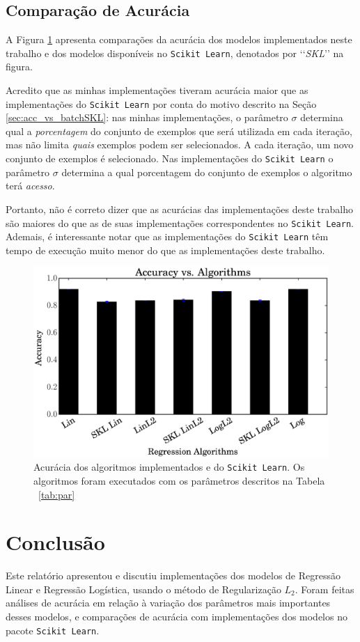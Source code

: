 \documentclass[a4paper, 12pt]{article}
\begin{document}
\newpage
\subsection{Comparação de Acurácia}

A Figura \ref{fig:algorithm} apresenta comparações da acurácia dos modelos
implementados neste trabalho e dos modelos disponíveis no \texttt{Scikit
Learn}, denotados por \lq\lq{}\textit{SKL}\rq\rq{} na figura.

Acredito que as minhas implementações tiveram acurácia maior que as
implementações do \texttt{Scikit Learn} por conta do motivo descrito na Seção
\ref{sec:acc_vs_batchSKL}: nas minhas implementações, o parâmetro $\sigma$
determina qual a \textit{porcentagem} do conjunto de exemplos que será
utilizada em cada iteração, mas não limita \textit{quais} exemplos podem ser
selecionados. A cada iteração, um novo conjunto de exemplos é selecionado. Nas
implementações do \texttt{Scikit Learn} o parâmetro $\sigma$ determina a qual
porcentagem do conjunto de exemplos o algoritmo terá \textit{acesso}.

Portanto, não é correto dizer que as acurácias das implementações deste
trabalho são maiores do que as de suas implementações correspondentes no
\texttt{Scikit Learn}. Ademais, é interessante notar que as implementações do
\texttt{Scikit Learn} têm tempo de execução muito menor do que as
implementações deste trabalho.

\begin{figure}[htpb]
    \centering
    \includegraphics[width=.8\textwidth]{acc_vs_algorithm}
    \caption{Acurácia dos algoritmos implementados e do
    \texttt{Scikit Learn}. Os algoritmos foram executados
    com os parâmetros descritos na Tabela ~\ref{tab:par}}
    \label{fig:algorithm}
\end{figure}

\newpage
\section{Conclusão} \label{sec:concl}

Este relatório apresentou e discutiu implementações dos modelos de Regressão
Linear e Regressão Logística, usando o método de Regularização $L_2$. Foram
feitas análises de acurácia em relação à variação dos parâmetros mais
importantes desses modelos, e comparações de acurácia com implementações dos
modelos no pacote \texttt{Scikit Learn}.
\end{document}
